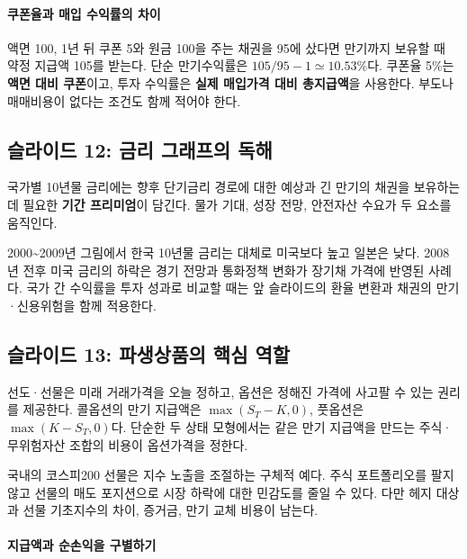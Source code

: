 \documentclass[11pt,a4paper]{article}
\begin{document}
\paragraph{쿠폰율과 매입 수익률의 차이}

액면 100, 1년 뒤 쿠폰 5와 원금 100을 주는 채권을 95에 샀다면 만기까지 보유할 때 약정 지급액 105를 받는다. 단순 만기수익률은 $105/95-1\simeq10.53\%$다. 쿠폰율 5\%는 \textbf{액면 대비 쿠폰}이고, 투자 수익률은 \textbf{실제 매입가격 대비 총지급액}을 사용한다. 부도나 매매비용이 없다는 조건도 함께 적어야 한다.
\par

\subsection{슬라이드 12: 금리 그래프의 독해}

국가별 10년물 금리에는 향후 단기금리 경로에 대한 예상과 긴 만기의 채권을 보유하는 데 필요한 \textbf{기간 프리미엄}이 담긴다. 물가 기대, 성장 전망, 안전자산 수요가 두 요소를 움직인다.
\par

2000\textasciitilde{}2009년 그림에서 한국 10년물 금리는 대체로 미국보다 높고 일본은 낮다. 2008년 전후 미국 금리의 하락은 경기 전망과 통화정책 변화가 장기채 가격에 반영된 사례다. 국가 간 수익률을 투자 성과로 비교할 때는 앞 슬라이드의 환율 변환과 채권의 만기·신용위험을 함께 적용한다.
\par

\subsection{슬라이드 13: 파생상품의 핵심 역할}

선도·선물은 미래 거래가격을 오늘 정하고, 옵션은 정해진 가격에 사고팔 수 있는 권리를 제공한다. 콜옵션의 만기 지급액은 $\max(S_T-K,0)$, 풋옵션은 $\max(K-S_T,0)$다. 단순한 두 상태 모형에서는 같은 만기 지급액을 만드는 주식·무위험자산 조합의 비용이 옵션가격을 정한다.
\par

국내의 코스피200 선물은 지수 노출을 조절하는 구체적 예다. 주식 포트폴리오를 팔지 않고 선물의 매도 포지션으로 시장 하락에 대한 민감도를 줄일 수 있다. 다만 헤지 대상과 선물 기초지수의 차이, 증거금, 만기 교체 비용이 남는다.
\par

\paragraph{지급액과 순손익을 구별하기}
\end{document}
